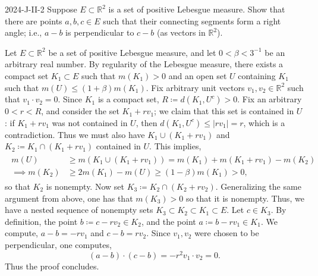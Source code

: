 \documentclass{article}
\begin{document}
	\begin{prb}{2024-J-II-2}
		Suppose $E \subset \mathbb{R}^{2}$ is a set of positive Lebesgue measure. Show that there are points $a, b, c \in E$ such that their connecting segments form a right angle; i.e., $a - b$ is perpendicular to $c - b$ (as vectors in $\mathbb{R}^{2}$). 
	\end{prb}
	Let $E \subset \mathbb{R}^{2}$ be a set of positive Lebesgue measure, and let $0 < \beta < 3^{-1}$ be an arbitrary real number. By regularity of the Lebesgue measure, there exists a compact set $K_{1} \subset E$ such that $m(K_1) > 0$ and an open set $U$ containing $K_{1}$ such that $m(U) \leq (1 + \beta)m(K_{1})$. Fix arbitrary unit vectors $v_{1}, v_{2} \in \mathbb{R}^{2}$ such that $v_{1} \cdot v_{2} = 0$. Since $K_{1}$ is a compact set, $R \coloneqq d(K_{1}, U^{c}) > 0$. Fix an arbitrary $0 < r < R$, and consider the set $K_{1} + rv_{1}$; we claim that this set is contained in $U$: if $K_{1} + rv_{1}$ was not contained in $U$, then $d(K_{1}, U^{c}) \leq |rv_{1}| = r$, which is a contradiction. Thus we must also have $K_{1} \cup (K_{1} + rv_{1})$ and $K_{2} \coloneqq K_{1}\cap (K_{1} + rv_{1})$ contained in $U$. This implies, 
	\begin{align*}
		\begin{split}
			m(U) &\geq m(K_{1} \cup (K_{1} + rv_{1})) = m(K_{1}) + m(K_{1} + rv_{1}) - m(K_{2}) \\
			\implies 
			m(K_{2}) &\geq 2m(K_{1}) - m(U) \geq (1 - \beta)m(K_{1}) > 0, 
		\end{split} 
	\end{align*}
	so that $K_{2}$ is nonempty. Now set $K_{3} \coloneqq K_{2} \cap (K_{2} + rv_{2})$. Generalizing the same argument from above, one has that $m(K_{3})> 0$ so that it is nonempty. Thus, we have a nested sequence of nonempty sets $K_{3} \subset K_{2} \subset K_{1} \subset E$. Let $c \in K_{3}$. By definition, the point $b \coloneqq c - rv_{2} \in K_{2}$, and the point $a \coloneqq b - rv_{1} \in K_{1}$. We compute, $a - b = -rv_{1}$ and $c - b = rv_{2}$. Since $v_{1}, v_{2}$ were chosen to be perpendicular, one computes, 
	\begin{equation*}
		(a - b) \cdot (c - b) = -r^{2} v_{1} \cdot v_{2} =0. 
	\end{equation*}
	Thus the proof concludes. 
		
\end{document}
